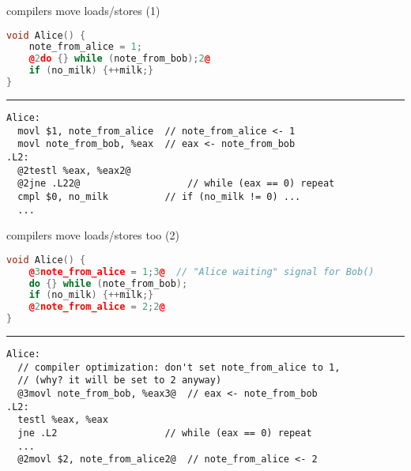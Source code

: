 \begin{frame}[fragile,label=compReorder]{compilers move loads/stores (1)}
\begin{lstlisting}[language=C++,style=small,
    moredelim={**[is][\btHL<2|handout:2>]{@2}{2@}},
    moredelim={**[is][\btHL<3|handout:3>]{@3}{3@}},
    moredelim={**[is][\btHL<4|handout:4>]{@4}{4@}},
    moredelim={**[is][\btHL<5|handout:5>]{@5}{5@}},
]
void Alice() {
    note_from_alice = 1;
    @2do {} while (note_from_bob);2@
    if (no_milk) {++milk;}
}
\end{lstlisting}
\hrule
\begin{lstlisting}[language=myasm,style=smaller,
    moredelim={**[is][\btHL<2|handout:2>]{@2}{2@}},
    moredelim={**[is][\btHL<3|handout:3>]{@3}{3@}},
    moredelim={**[is][\btHL<4|handout:4>]{@4}{4@}},
    moredelim={**[is][\btHL<5|handout:5>]{@5}{5@}},
]
Alice:
  movl $1, note_from_alice  // note_from_alice <- 1
  movl note_from_bob, %eax  // eax <- note_from_bob
.L2:
  @2testl %eax, %eax2@
  @2jne .L22@                   // while (eax == 0) repeat
  cmpl $0, no_milk          // if (no_milk != 0) ...
  ...
\end{lstlisting}
\end{frame}

\begin{frame}[fragile,label=compReorder2]{compilers move loads/stores too (2)}
\begin{lstlisting}[language=C++,style=smaller,
    moredelim={**[is][\btHL<2|handout:2>]{@2}{2@}},
    moredelim={**[is][\btHL<3|handout:3>]{@3}{3@}},
    moredelim={**[is][\btHL<4|handout:4>]{@4}{4@}},
    moredelim={**[is][\btHL<5|handout:5>]{@5}{5@}},
]
void Alice() {
    @3note_from_alice = 1;3@  // "Alice waiting" signal for Bob()
    do {} while (note_from_bob);
    if (no_milk) {++milk;}
    @2note_from_alice = 2;2@
}
\end{lstlisting}
\hrule
\begin{lstlisting}[language=myasm,style=smaller,
    moredelim={**[is][\btHL<2|handout:2>]{@2}{2@}},
    moredelim={**[is][\btHL<3|handout:3>]{@3}{3@}},
    moredelim={**[is][\btHL<4|handout:4>]{@4}{4@}},
    moredelim={**[is][\btHL<5|handout:5>]{@5}{5@}},
]
Alice:  
  // compiler optimization: don't set note_from_alice to 1,
  // (why? it will be set to 2 anyway)
  @3movl note_from_bob, %eax3@  // eax <- note_from_bob
.L2:
  testl %eax, %eax          
  jne .L2                   // while (eax == 0) repeat
  ...
  @2movl $2, note_from_alice2@  // note_from_alice <- 2
\end{lstlisting}
\end{frame}
